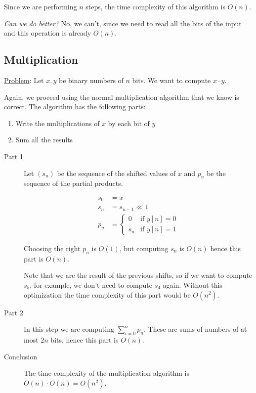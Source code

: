 \documentclass[12pt]{extarticle}
\begin{document}
Since we are performing $n$ steps, the time complexity of this algorithm is $O(n)$.

\textit{Can we do better?} No, we can't, since we need to read all the bits of the input and this operation is already $O(n)$.

\subsection{Multiplication}

\underline{Problem}: Let $x, y$ be binary numbers of $n$ bits. We want to compute $x \cdot y$.

Again, we proceed using the normal multiplication algorithm that we know is correct.
The algorithm has the following parts:
\begin{enumerate}
    \item Write the multiplications of $x$ by each bit of $y$
    \item Sum all the results
\end{enumerate}

\begin{description}
    \item[Part 1]
          Let $(s_n)$ be the sequence of the shifted values of $x$ and $p_n$ be the sequence of the partial products.


          \begin{align*}
              s_0 & = x                         \\
              s_n & = s_{n-1} \ll 1             \\
              p_n & = \begin{cases*}
                          0   & \text{if } y[n] = 0 \\
                          s_n & \text{if } y[n] = 1
                      \end{cases*}
          \end{align*}

          Choosing the right $p_n$ is $O(1)$, but computing $s_n$ is $O(n)$ hence this part is $O(n)$.

          Note that we are  the result of the previous shifts, so if we want to compute $s_5$, for example, we don't need to compute $s_4$ again.
          Without this optimization the time complexity of this part would be $O(n^2)$.

    \item[Part 2]
          In this step we are computing $\sum_{i = 0}^n p_n$.
          These are sums of numbers of at most $2n$ bits, hence this part is $O(n)$.

    \item[Conclusion]
          The time complexity of the multiplication algorithm is $O(n) \cdot O(n) = O(n^2)$.

\end{description}
\end{document}
